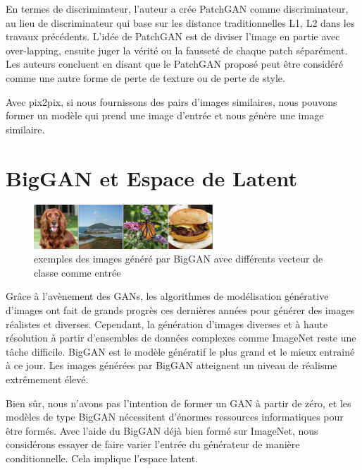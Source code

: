 En termes de discriminateur, l'auteur a crée PatchGAN comme discriminateur, au lieu de  discriminateur qui base sur les distance traditionnelles L1, L2 dans les travaux précédents. L'idée de PatchGAN est de diviser l'image en partie avec over-lapping, ensuite juger la vérité ou la fausseté de chaque patch séparément. Les auteurs concluent en disant que le PatchGAN proposé peut être considéré comme une autre forme de perte de texture ou de perte de style.

Avec pix2pix, si nous fournissons des pairs d'images similaires, nous pouvons former un modèle qui prend une image d'entrée et nous génère une image similaire.


\section{BigGAN et Espace de Latent}

\begin{figure}[H] 
	\centering 
	\includegraphics[width=0.6\textwidth]{./resources/img/bigGAN_sample.jpg} %
	\caption{exemples des images généré par BigGAN avec différents vecteur de classe comme entrée\cite{brock2018large}} %
	\label{Fig3_2} %
\end{figure}
Grâce à l'avènement des GANs, les algorithmes de modélisation générative d'images ont fait de grands progrès ces dernières années pour générer des images réalistes et diverses. Cependant, la génération d'images diverses et à haute résolution à partir d'ensembles de données complexes comme ImageNet reste une tâche difficile. BigGAN est le modèle génératif le plus grand et le mieux entrainé à ce jour. Les images générées par BigGAN atteignent un niveau de réalisme extrêmement élevé\cite{brock2018large}.

Bien sûr, nous n'avons pas l'intention de former un GAN à partir de zéro, et les modèles de type BigGAN nécessitent d'énormes ressources informatiques pour être formés. Avec l'aide du BigGAN déjà bien formé sur ImageNet, nous considérons essayer de faire varier l'entrée du générateur de manière conditionnelle. Cela implique l'espace latent. \\


